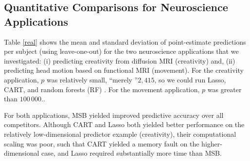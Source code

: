  



\subsection{Quantitative Comparisons for Neuroscience Applications} \label{sub:real}



Table \ref{real} shows the mean and standard deviation of point-estimate predictions per subject (using leave-one-out) for the two neuroscience applications that we investigated: (i) predicting creativity from diffusion MRI (creativity) and, (ii) predicting head motion based on functional MRI (movement).  For the creativity application, $p$ was relatively small, ``merely ''$2,415$, so we could run Lasso, CART, and random forests (RF) \cite{Brieman2001}.  For the movement application, $p$ was greater than $100\,000$.. 

For both applications, MSB yielded improved predictive accuracy over all competitors.  Although CART and Lasso both yielded better performance on the relatively low-dimensional predictor example (creativity), their computational scaling was poor, such that CART yielded a memory fault on the higher-dimensional case, and Lasso required substantially more time than MSB.  







